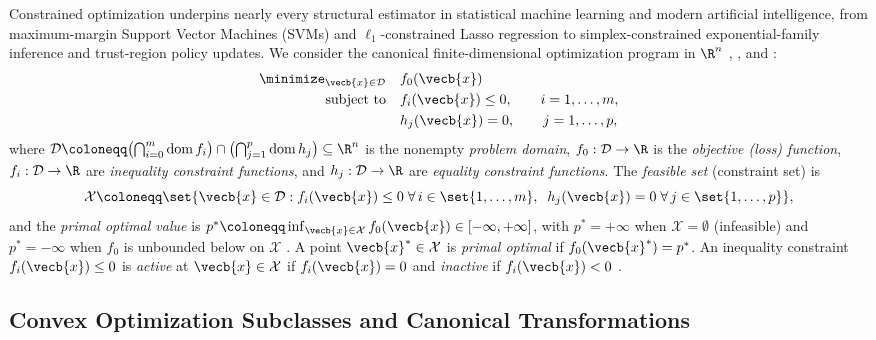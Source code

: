 \documentclass[../../../../master.tex]{subfiles}
\begin{document}
Constrained optimization underpins nearly every structural estimator in statistical machine learning and modern artificial intelligence, from maximum-margin Support Vector Machines (SVMs) and $\ell_1$-constrained Lasso regression to simplex-constrained exponential-family inference and trust-region policy updates. We consider the canonical finite-dimensional optimization program in $\R^n$ , , and :
\begin{equation}
  \begin{aligned}
    \minimize_{\vecb{x} \in \mathcal{D}} \quad & f_0(\vecb{x}) \\
    \text{subject to} \quad & f_i(\vecb{x}) \le 0, \qquad i = 1, \dots, m, \\
                             & h_j(\vecb{x}) = 0, \qquad j = 1, \dots, p,
  \end{aligned}
  \label{eq:convex:primal_std}
\end{equation}
where $\mathcal{D} \coloneqq \bigl(\bigcap_{i=0}^m \operatorname{dom} f_i\bigr) \cap \bigl(\bigcap_{j=1}^p \operatorname{dom} h_j\bigr) \subseteq \R^n$ is the nonempty \emph{problem domain}, $f_0 : \mathcal{D} \to \R$ is the \emph{objective (loss) function}, $f_i : \mathcal{D} \to \R$ are \emph{inequality constraint functions}, and $h_j : \mathcal{D} \to \R$ are \emph{equality constraint functions}. The \emph{feasible set} (constraint set) is
\begin{equation}
  \mathcal{X} \coloneqq \set{\vecb{x} \in \mathcal{D} : f_i(\vecb{x}) \le 0\;\forall\,i \in \set{1,\dots,m},\;\; h_j(\vecb{x}) = 0\;\forall\,j \in \set{1,\dots,p}},
  \label{eq:convex:feasible_set}
\end{equation}
and the \emph{primal optimal value} is $p^* \coloneqq \inf_{\vecb{x} \in \mathcal{X}} f_0(\vecb{x}) \in [-\infty, +\infty]$, with $p^* = +\infty$ when $\mathcal{X} = \emptyset$ (infeasible) and $p^* = -\infty$ when $f_0$ is unbounded below on $\mathcal{X}$ . A point $\vecb{x}^* \in \mathcal{X}$ is \emph{primal optimal} if $f_0(\vecb{x}^*) = p^*$. An inequality constraint $f_i(\vecb{x}) \le 0$ is \emph{active} at $\vecb{x} \in \mathcal{X}$ if $f_i(\vecb{x}) = 0$ and \emph{inactive} if $f_i(\vecb{x}) < 0$ .

\subsection{Convex Optimization Subclasses and Canonical Transformations}
\end{document}
